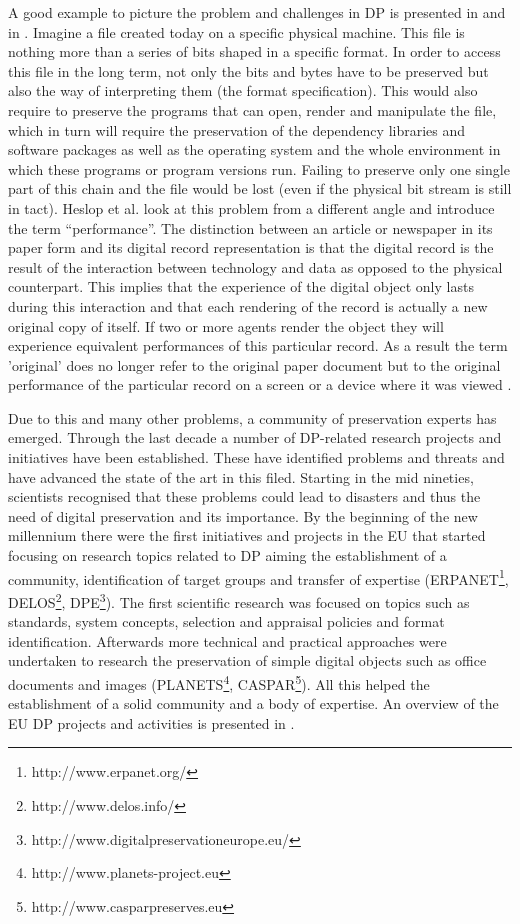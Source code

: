 A good example to picture the problem and challenges in DP is presented in \cite{Lorie:2001:LTP:379437.379726} and in \cite{Rauber:2009:dpchallenges}. Imagine a file created today on a specific physical machine. This file is nothing more than a series of bits shaped in a specific format. In order to access this file in the long term, not only the bits and bytes have to be preserved but also the way of interpreting them (the format specification). This would also require to preserve the programs that can open, render and manipulate the file, which in turn will require the preservation of the dependency libraries and software packages as well as the operating system and the whole environment in which these programs or program versions run. Failing to preserve only one single part of this chain and the file would be lost (even if the physical bit stream is still in tact). Heslop et al. look at this problem from a different angle and introduce the term ``performance''. The distinction between an article or newspaper in its paper form and its digital record representation is that the digital record is the result of the interaction between technology and data as opposed to the physical counterpart. This implies that the experience of the digital object only lasts during this interaction and that each rendering of the record is actually a new original copy of itself. If two or more agents render the object they will experience equivalent performances of this particular record. As a result the term 'original' does no longer refer to the original paper document but to the original performance of the particular record on a screen or a device where it was viewed \cite{nla.cat-vn3423702}.

Due to this and many other problems, a community of preservation experts has emerged.
Through the last decade a number of DP-related research projects and initiatives have been established.
These have identified problems and threats and have advanced the state of the art in this filed.
Starting in the mid nineties, scientists recognised that these problems could lead to disasters and thus the need of digital preservation and its importance.
By the beginning of the new millennium there were the first initiatives and projects in the EU that started focusing on research topics related to DP aiming the establishment of a community, identification of target groups and transfer of expertise (ERPANET\footnote{http://www.erpanet.org/}, DELOS\footnote{http://www.delos.info/}, DPE\footnote{http://www.digitalpreservationeurope.eu/}).
The first scientific research was focused on topics such as standards, system concepts, selection and appraisal policies and format identification.
Afterwards more technical and practical approaches were undertaken to research the preservation of simple digital objects such as office documents and images (PLANETS\footnote{http://www.planets-project.eu}, CASPAR\footnote{http://www.casparpreserves.eu}).
All this helped the establishment of a solid community and a body of expertise.
An overview of the EU DP projects and activities is presented in \cite{strodl:2011:dpreport}.

